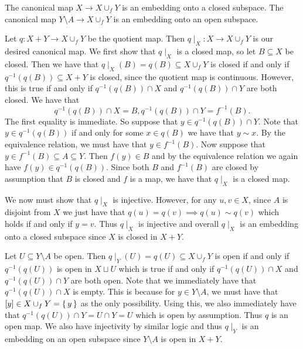 \documentclass[letterpaper, 11pt, oneside]{book}
\begin{document}
\begin{prop}\label{prop: attachment_mappings}
  The canonical map $X \to X \cup_{f} Y$ is an embedding onto a closed subspace.
  The canonical map $Y \setminus A \to X \cup_{f} Y$ is an embedding onto an open subspace.
\end{prop}
\begin{pf}


  Let $q\colon X + Y \to X \cup_{f} Y$ be the quotient map.
  Then $q\mid_{X}\colon X \to X \cup_{f} Y$ is our desired canonical map.
  We first show that $q\mid_{X}$ is a closed map, so let $B \subseteq X$ be closed.
  Then we have that $q\mid_{X}(B) = q(B) \subseteq X \cup_{f} Y$ is closed if and only if $q^{-1}(q(B)) \subseteq X + Y$ is closed, since the quotient map is continuous.
  However, this is true if and only if $q^{-1}(q(B)) \cap X$ and $q^{-1}(q(B)) \cap Y$ are both closed.
  We have that
  \[
    q^{-1}(q(B)) \cap X = B, q^{-1}(q(B)) \cap Y = f^{-1}(B).
  \]
  The first equality is immediate.
  So suppose that $y \in q^{-1}(q(B)) \cap Y$.
  Note that $y \in q^{-1}(q(B))$ if and only for some $x \in q(B)$ we have that $y \sim x$.
  By the equivalence relation, we must have that $y \in f^{-1}(B)$.
  Now suppose that $y \in f^{-1}(B) \subseteq A \subseteq Y$.
  Then $f(y) \in B$ and by the equivalence relation we again have $f(y) \in q^{-1}(q(B))$.
  Since both $B$ and $f^{-1}(B)$ are closed by assumption that $B$ is closed and $f$ is a map, we have that $q\mid_{X}$ is a closed map.

  We now must show that $q\mid_{X}$ is injective.
  However, for any $u, v \in X$, since $A$ is disjoint from $X$ we just have that $q(u) = q(v) \implies q(u) \sim q(v)$ which holds if and only if $y = v$.
  Thus $q\mid_{X}$ is injective and overall $q\mid_{X}$ is an embedding onto a closed subspace since $X$ is closed in $X + Y$.

  Let $U \subseteq Y \setminus A$ be open.
  Then $q\mid_Y(U) = q(U) \subseteq X \cup_f Y$ is open if and only if $q^{-1}(q(U))$ is open in $X \sqcup U$ which is true if and only if $q^{-1}(q(U)) \cap X$ and $q^{-1}(q(U)) \cap Y$ are both open.
  Note that we immediately have that $q^{-1}(q(U)) \cap X$ is empty.
  This is because for $y \in Y \setminus A$, we must have that $[y] \in X \cup_{f} Y = \set{y}$ as the only possibility.
  Using this, we also immediately have that $q^{-1}(q(U)) \cap Y = U \cap Y = U$ which is open by assumption.
  Thus $q$ is an open map.
  We also have injectivity by similar logic and thus $q\mid_{Y}$ is an embedding on an open subspace since $Y \setminus A$ is open in $X + Y$.
\end{pf}
\end{document}
